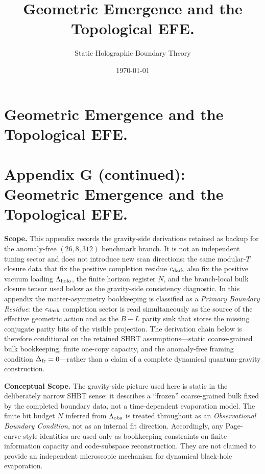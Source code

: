 \documentclass[11pt]{article}
\title{Geometric Emergence and the Topological EFE.}
\author{Static Holographic Boundary Theory}
\date{\today}
\begin{document}
\maketitle
\fi

\makeatletter
\providecommand{\manualappendixlabel}[2]{%
  \begingroup
  \def\@currentlabel{#1}%
  \label{#2}%
  \endgroup
}
\newcommand{\gravitymainref}[1]{%
  \@ifundefined{r@#1}{%
    \@ifundefined{r@tn-#1}{\ref{#1}}{\ref{tn-#1}}%
  }{%
    \ref{#1}%
  }%
}
\makeatother

\ifgravitystandalone
\section{Geometric Emergence and the Topological EFE.}\label{app:gravity}\label{sec:gravity-einstein}
\else
\section*{Appendix G (continued): Geometric Emergence and the Topological EFE.}\manualappendixlabel{G}{app:gravity}\manualappendixlabel{G}{sec:gravity-einstein}
\fi

\noindent\textbf{Scope.} This appendix records the gravity-side derivations retained as backup for the anomaly-free $(26,8,312)$ benchmark branch. It is not an independent tuning sector and does not introduce new scan directions: the same modular-$T$ closure data that fix the positive completion residue $c_{\rm dark}$ also fix the positive vacuum loading $\Lambda_{\rm holo}$, the finite horizon register $N$, and the branch-local bulk closure tensor used below as the gravity-side consistency diagnostic. In this appendix the matter-asymmetry bookkeeping is classified as a \emph{Primary Boundary Residue}: the $c_{\rm dark}$ completion sector is read simultaneously as the source of the effective geometric action and as the $B-L$ parity sink that stores the missing conjugate parity bits of the visible projection. The derivation chain below is therefore conditional on the retained SHBT assumptions---static coarse-grained bulk bookkeeping, finite one-copy capacity, and the anomaly-free framing condition $\Delta_{\rm fr}=0$---rather than a claim of a complete dynamical quantum-gravity construction.

\noindent\textbf{Conceptual Scope.} The gravity-side picture used here is static in the deliberately narrow SHBT sense: it describes a ``frozen'' coarse-grained bulk fixed by the completed boundary data, not a time-dependent evaporation model. The finite bit budget $N$ inferred from $\Lambda_{\rm obs}$ is treated throughout as an \emph{Observational Boundary Condition}, not as an internal fit direction. Accordingly, any Page-curve-style identities are used only as bookkeeping constraints on finite information capacity and code-subspace reconstruction. They are not claimed to provide an independent microscopic mechanism for dynamical black-hole evaporation.
\end{document}
